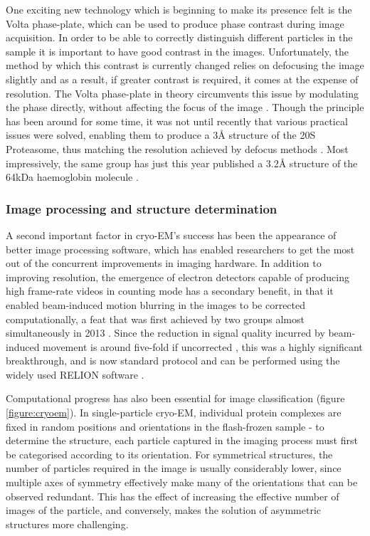 \documentclass[a4paper,11pt,twoside,openright]{scrbook}
\begin{document}
One exciting new technology which is beginning to make its presence felt is the Volta phase-plate, which can be used to produce phase contrast during image acquisition. In order to be able to correctly distinguish different particles in the sample it is important to have good contrast in the images. Unfortunately, the method by which this contrast is currently changed relies on defocusing the image slightly and as a result, if greater contrast is required, it comes at the expense of resolution. The Volta phase-plate in theory circumvents this issue by modulating the phase directly, without affecting the focus of the image \cite{Danev2014}. Though the principle has been around for some time, it was not until recently that various practical issues were solved, enabling them to produce a 3Å structure of the 20S Proteasome, thus matching the resolution achieved by defocus methods \cite{Danev2016}. Most impressively, the same group has just this year published a 3.2Å structure of the 64kDa haemoglobin molecule \cite{Khoshouei2017}.

\subsubsection{Image processing and structure determination}
A second important factor in cryo-EM's success has been the appearance of better image processing software, which has enabled researchers to get the most out of the concurrent improvements in imaging hardware. In addition to improving resolution, the emergence of electron detectors capable of producing high frame-rate videos in counting mode has a secondary benefit, in that it enabled beam-induced motion blurring in the images to be corrected computationally, a feat that was first achieved by two groups almost simultaneously in 2013 \cite{Bai2013, Li2013}. Since the reduction in signal quality incurred by beam-induced movement is around five-fold if uncorrected \cite{Henderson1985}, this was a highly significant breakthrough, and is now standard protocol and can be performed using the widely used RELION software \cite{Scheres2012,Scheres2014}.


Computational progress has also been essential for image classification (figure \ref{figure:cryoem}). In single-particle cryo-EM, individual protein complexes are fixed in random positions and orientations in the flash-frozen sample - to determine the structure, each particle captured in the imaging process must first be categorised according to its orientation. For symmetrical structures, the number of particles required in the image is usually considerably lower, since multiple axes of symmetry effectively make many of the orientations that can be observed redundant. This has the effect of increasing the effective number of images of the particle, and conversely, makes the solution of asymmetric structures more challenging.
\end{document}
